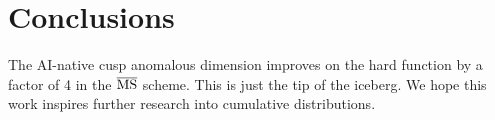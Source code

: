 \section{Conclusions}\label{sec:conclusions}

The AI-native cusp anomalous dimension improves on the hard function by
a factor of 4 in the $\overline{\rm MS}$ scheme. This is just the tip of
the iceberg. We hope this work inspires further research into cumulative
distributions.

